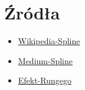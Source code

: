 \documentclass{article}
\begin{document}
\section{Źródła}
\begin{itemize}
	\item \href{https://en.wikipedia.org/w/index.php?title=Spline_%28mathematics%29&oldid=288288033#Algorithm_for_computing_natural_cubic_splines}{Wikipedia-Spline}
	\item \href{https://medium.com/eatpredlove/natural-cubic-splines-implementation-with-python-edf68feb57aa}{Medium-Spline}
	\item \href{https://pl.wikipedia.org/wiki/Efekt_Rungego}{Efekt-Rungego}
\end{itemize}
\end{document}
